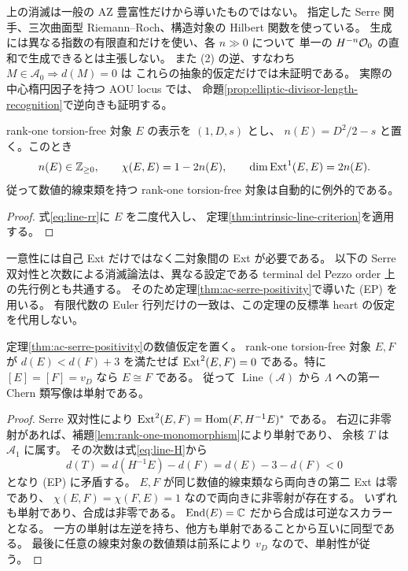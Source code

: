 \begin{remark}[入力と結論の範囲]\label{rem:serre-inputs}
上の消滅は一般の AZ 豊富性だけから導いたものではない。
指定した Serre 関手、三次曲面型 Riemann--Roch、構造対象の Hilbert 関数を使っている。
生成には異なる指数の有限直和だけを使い、各 $n\gg0$ について
単一の $H^{-n}\mathcal O_0$ の直和で生成できるとは主張しない。
また (2) の逆、すなわち $M\in\mathcal A_0\Rightarrow d(M)=0$ は
これらの抽象的仮定だけでは未証明である。
実際の中心楕円因子を持つ AOU locus では、
命題\ref{prop:elliptic-divisor-length-recognition}で逆向きも証明する。
\end{remark}

\begin{corollary}[零次元欠損の数値的類似]\label{cor:line-numerical-defect}
rank-one torsion-free 対象 $E$ の表示を $(1,D,s)$ とし、
$n(E)=D^2/2-s$ と置く。このとき
\[
 n(E)\in\mathbb Z_{\ge0},\qquad
 \chi(E,E)=1-2n(E),\qquad
 \dim\operatorname{Ext}^1(E,E)=2n(E).
\]
従って数値的線束類を持つ rank-one torsion-free 対象は自動的に例外的である。
\end{corollary}
\begin{proof}
式\eqref{eq:line-rr}に $E$ を二度代入し、
定理\ref{thm:intrinsic-line-criterion}を適用する。
\end{proof}

一意性には自己 Ext だけではなく二対象間の Ext が必要である。
以下の Serre 双対性と次数による消滅論法は、異なる設定である
terminal del Pezzo order 上の先行例\cite[Lemma 3.9]{HR}とも共通する。
そのため定理\ref{thm:ac-serre-positivity}で導いた (EP) を用いる。
有限代数の Euler 行列だけの一致は、この定理の反標準 heart の仮定を代用しない。

\begin{theorem}[数値的線束類における一意性]\label{thm:numerical-line-uniqueness}
定理\ref{thm:ac-serre-positivity}の数値仮定を置く。
rank-one torsion-free 対象 $E,F$ が $d(E)<d(F)+3$ を満たせば
$\operatorname{Ext}^2(E,F)=0$ である。特に $[E]=[F]=v_D$ なら $E\cong F$ である。
従って $\operatorname{Line}(\mathcal A)$ から $\Lambda$ への第一 Chern 類写像は単射である。
\end{theorem}
\begin{proof}
Serre 双対性により $\operatorname{Ext}^2(E,F)=\operatorname{Hom}(F,H^{-1}E)^*$ である。
右辺に非零射があれば、補題\ref{lem:rank-one-monomorphism}により単射であり、
余核 $T$ は $\mathcal A_1$ に属す。
その次数は式\eqref{eq:line-H}から
\[
 d(T)=d(H^{-1}E)-d(F)=d(E)-3-d(F)<0
\]
となり (EP) に矛盾する。
$E,F$ が同じ数値的線束類なら両向きの第二 Ext は零であり、
$\chi(E,F)=\chi(F,E)=1$ なので両向きに非零射が存在する。
いずれも単射であり、合成は非零である。
$\operatorname{End}(E)=\mathbb C$ だから合成は可逆なスカラーとなる。
一方の単射は左逆を持ち、他方も単射であることから互いに同型である。
最後に任意の線束対象の数値類は前系により $v_D$ なので、単射性が従う。
\end{proof}

